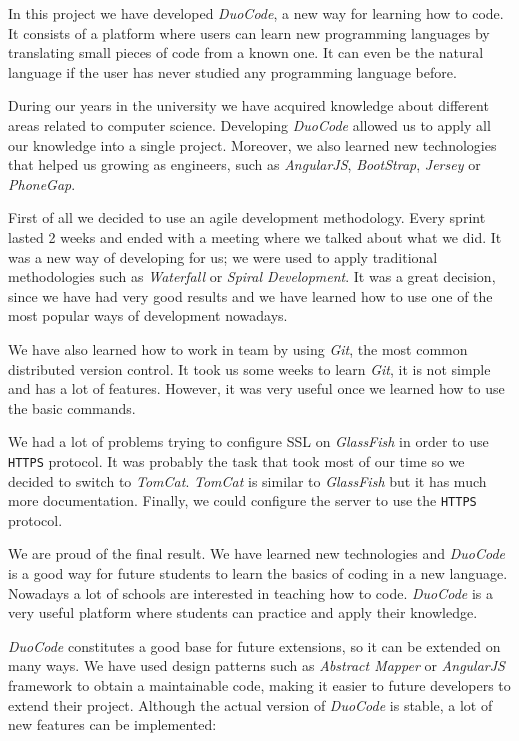 
In this project we have developed \textit{DuoCode}, a new way for learning how to code. It consists of a platform where users can learn new programming languages by translating small pieces of code from a known one. It can even be the natural language if the user has never studied any programming language before.

During our years in the university we have acquired knowledge about different areas related to computer science. Developing \textit{DuoCode} allowed us to apply all our knowledge into a single project. Moreover, we also learned new technologies that helped us growing as engineers, such as \textit{AngularJS}, \textit{BootStrap}, \textit{Jersey} or \textit{PhoneGap}.

First of all we decided to use an agile development methodology. Every sprint lasted 2 weeks and ended with a meeting where we talked about what we did. It was a new way of developing for us; we were used to apply traditional methodologies such as \textit{Waterfall} or \textit{Spiral Development}. It was a great decision, since we have had very good results and we have learned how to use one of the most popular ways of development nowadays.

We have also learned how to work in team by using \textit{Git}, the most common distributed version control. It took us some weeks to learn \textit{Git}, it is not simple and has a lot of features.
However, it was very useful once we learned how to use the basic commands.

We had a lot of problems trying to configure SSL on \textit{GlassFish} in order to use \texttt{HTTPS} protocol. It was probably the task that took most of our time so we decided to switch to \textit{TomCat}. \textit{TomCat} is similar to \textit{GlassFish} but it has much more documentation. Finally, we could configure the server to use the \texttt{HTTPS} protocol.

We are proud of the final result. We have learned new technologies and \textit{DuoCode} is a good way for future students to learn the basics of coding in a new language. Nowadays a lot of schools are interested in teaching how to code. \textit{DuoCode} is a very useful platform where students can practice and apply their knowledge.

\textit{DuoCode} constitutes a good base for future extensions, so it can be extended on many ways. We have used design patterns such as \textit{Abstract Mapper} or \textit{AngularJS} framework to obtain a maintainable code, making it easier to future developers to extend their project. Although the actual version of \textit{DuoCode} is stable, a lot of new features can be implemented:


